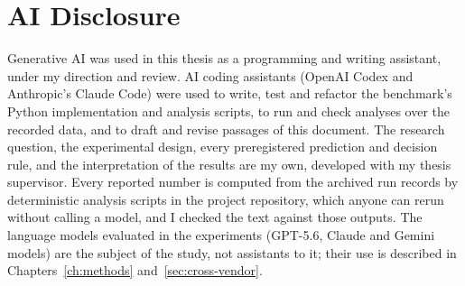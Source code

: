 \documentclass[12pt,oneside]{report}
\begin{document}
%

\tableofcontents
\clearpage
\listoftables
{}
\clearpage
\chapter*{AI Disclosure}

Generative AI was used in this thesis as a programming and writing assistant,
under my direction and review. AI coding assistants (OpenAI Codex and
Anthropic's Claude Code) were used to write, test and refactor the benchmark's
Python implementation and analysis scripts, to run and check analyses over the
recorded data, and to draft and revise passages of this document. The research
question, the experimental design, every preregistered prediction and
decision rule, and the interpretation of the results are my own, developed
with my thesis supervisor. Every reported number is computed from the archived
run records by deterministic analysis scripts in the project repository,
which anyone can rerun without calling a model, and I checked the text against
those outputs. The language models evaluated in the experiments (GPT-5.6,
Claude and Gemini models) are the subject of the study, not assistants to it;
their use is described in Chapters~\ref{ch:methods}
and~\ref{sec:cross-vendor}.
\clearpage
{}
\setcounter{page}{1}
\end{document}
